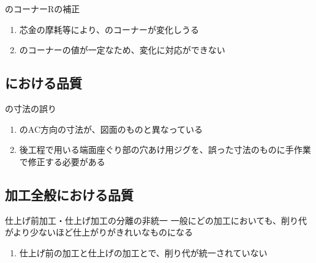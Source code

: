 \begin{Issues}{\EndFaceInCChamferMilling のコーナーRの補正}
\begin{enumerate}[label=\sarrow]
\item{}芯金の摩耗等により、\EndFaceInCChamfer のコーナーが変化しうる
\item[{\sarrow[red]}]\EndFaceInCChamferMilling のコーナーの値が一定なため、変化に対応ができない
\end{enumerate}
\end{Issues}


\clearpage
\subsection{\EndFaceBoringMilling における品質}

\begin{Issues}{\EndFaceBoringMilling の寸法の誤り}
\begin{enumerate}[label=\sarrow]
\item[{\sarrow[red]}]\EndFaceBoringMilling のAC方向の寸法が、図面のものと異なっている
\item 後工程で用いる端面座ぐり部の穴あけ用ジグを、誤った寸法のものに手作業で修正する必要がある
\end{enumerate}
\end{Issues}


\subsection{加工全般における品質}

\begin{Issues}{仕上げ前加工・仕上げ加工の分離の非統一}
一般にどの加工においても、削り代がより少ないほど仕上がりがきれいなものになる
\begin{enumerate}[label=\sarrow]
\item[{\sarrow[red]}]仕上げ前の加工と仕上げの加工とで、削り代が統一されていない
\end{enumerate}
\end{Issues}

